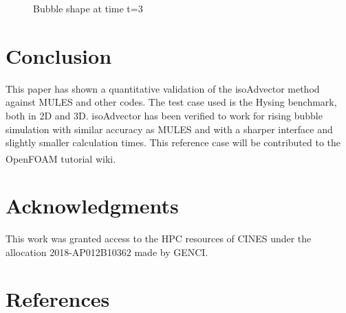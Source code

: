 \documentclass[review]{elsarticle}
\begin{document}
\begin{figure}[!h]
\begin{center}
 \vspace{-2mm}
\end{center}
\caption{Bubble shape at time t=3}
\label{fig:HB_bubble_shape_3}
\end{figure}

\section{\small Conclusion}
This paper has shown a quantitative validation of the isoAdvector method against MULES and other 
codes. The test case used is the Hysing benchmark, both in 2D and 3D. isoAdvector has been verified to work for rising bubble simulation with similar accuracy as MULES and with a sharper interface and slightly smaller calculation times.
This reference case will be contributed to the OpenFOAM\textsuperscript{\textregistered} tutorial wiki.

\section*{Acknowledgments}
\noindent
This  work  was  granted  access  to  the  HPC  resources  of CINES under the 
allocation 2018-AP012B10362 made by GENCI.

\section*{References}


\end{document}

